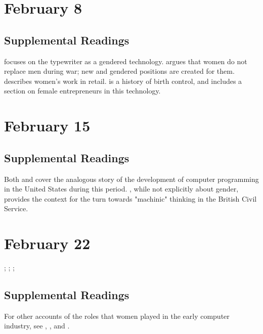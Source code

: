 \documentclass[11pt]{article}
\begin{document}
\section{February 8}
\label{sec:org49f48ca}


\subsection{Supplemental Readings}
\label{sec:org8ba39b4}

\cite{Davies:1982vb} focuses on the typewriter as a gendered technology.
\cite{Milkman:1987tl} argues that women do not replace men during war;
new and gendered positions are created for them. \cite{Benson:1987wl}
describes women's work in retail. \cite{Tone:2001to} is a history of
birth control, and includes a section on female entrepreneurs in this
technology.

\section{February 15}
\label{sec:org459714d}


\subsection{Supplemental Readings}
\label{sec:org34ba31d}

Both \cite{Ensmenger:2010te} and \cite{Abbate:2012wq} cover the
analogous story of the development of computer programming in the United
States during this period. \cite{Agar:2003wf}, while not explicitly
about gender, provides the context for the turn towards "machinic"
thinking in the British Civil Service.

\section{February 22}
\label{sec:org2b9269e}

; ; ;

\subsection{Supplemental Readings}
\label{sec:org80588d3}

For other accounts of the roles that women played in the early computer
industry, see \cite{Shetterly:2016vl}, \cite{Grier:2005tq}, and
\cite{Gurer:1996it}.
\end{document}
